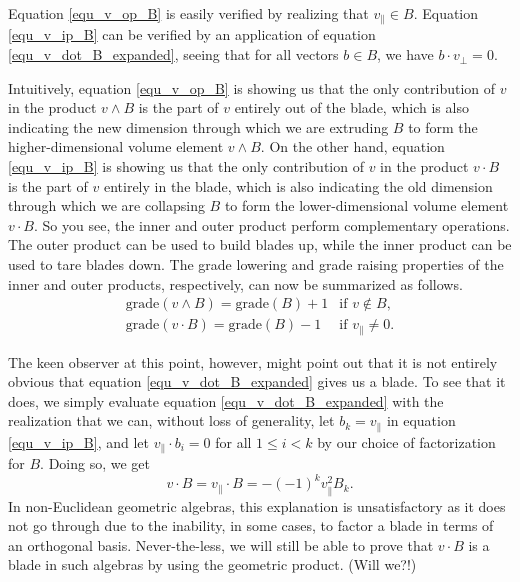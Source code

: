 \documentclass[12pt]{article}
\numberwithin{equation}{section}
\begin{document}
Equation \eqref{equ_v_op_B} is easily verified by realizing that $v_{\parallel}\in B$.
Equation \eqref{equ_v_ip_B} can be verified by an application of
equation \eqref{equ_v_dot_B_expanded}, seeing that for all
vectors $b\in B$, we have $b\cdot v_{\perp}=0$.

Intuitively, equation \eqref{equ_v_op_B} is showing us that
the only contribution of $v$ in the product $v\wedge B$
is the part of $v$ entirely out of the blade, which is also indicating
the new dimension through which we are extruding $B$ to
form the higher-dimensional volume element $v\wedge B$.
On the other hand, equation \eqref{equ_v_ip_B} is showing us
that the only contribution of $v$ in the product $v\cdot B$
is the part of $v$ entirely in the blade, which is also indicating
the old dimension through which we are collapsing $B$ to
form the lower-dimensional volume element $v\cdot B$.
So you see, the inner and outer product perform complementary
operations.  The outer product can be used to build blades up, while
the inner product can be used to tare blades down.
The grade lowering and grade raising properties of the inner
and outer products, respectively, can now be summarized
as follows.
\begin{equation}
\begin{array}{ll}
\mbox{grade}(v\wedge B) = \mbox{grade}(B)+1 & \mbox{if $v\not\in B$,} \\
\mbox{grade}(v\cdot B) = \mbox{grade}(B)-1 & \mbox{if $v_{\parallel}\neq 0$.}
\end{array}
\end{equation}

The keen observer at this point, however, might point
out that it is not entirely obvious that equation
\eqref{equ_v_dot_B_expanded} gives us a blade.  To see that
it does, we simply evaluate equation \eqref{equ_v_dot_B_expanded} with
the realization that we can, without loss of generality, let $b_k=v_{\parallel}$
in equation \eqref{equ_v_ip_B}, and let $v_{\parallel}\cdot b_i=0$ for all
$1\leq i<k$ by our choice of factorization for $B$.  Doing so, we get
\begin{equation}
v\cdot B = v_{\parallel}\cdot B = -(-1)^k v_{\parallel}^2 B_k.
\end{equation}
In non-Euclidean geometric algebras, this explanation is
unsatisfactory as it does not go through due to the inability, in some cases, to factor a blade in
terms of an orthogonal basis.  Never-the-less, we will still be able to prove that $v\cdot B$ is a
blade in such algebras by using the geometric product.  (Will we?!)
\end{document}
